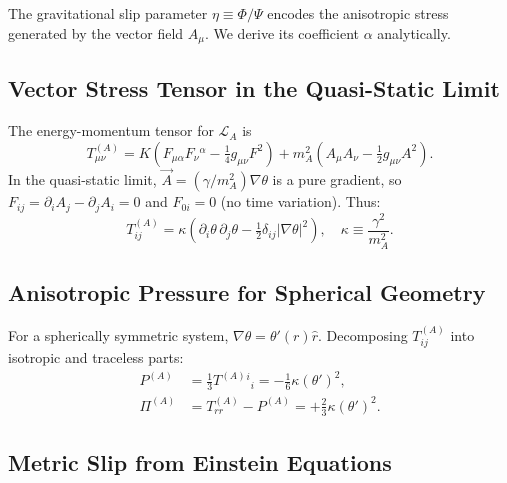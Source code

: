 \documentclass[aps,prd,twocolumn,showpacs,superscriptaddress]{revtex4-2}
\newcommand{\Lbar}{\mathcal{L}}
\begin{document}
The gravitational slip parameter $\eta \equiv \Phi/\Psi$ encodes the
anisotropic stress generated by the vector field $A_\mu$.
We derive its coefficient $\alpha$ analytically.

\subsection{Vector Stress Tensor in the Quasi-Static Limit}

The energy-momentum tensor for $\Lbar_A$ is
\begin{equation}
  T^{(A)}_{\mu\nu} = K\!\left(F_{\mu\alpha}F_\nu{}^\alpha
    - \tfrac{1}{4}g_{\mu\nu}F^2\right)
    + m_A^2\!\left(A_\mu A_\nu - \tfrac{1}{2}g_{\mu\nu}A^2\right).
\end{equation}
In the quasi-static limit, $\vec{A} = (\gamma/m_A^2)\nabla\theta$ is
a pure gradient, so $F_{ij} = \partial_i A_j - \partial_j A_i = 0$
and $F_{0i} = 0$ (no time variation). Thus:
\begin{equation}
  T^{(A)}_{ij} = \kappa\!\left(
    \partial_i\theta\,\partial_j\theta
    - \tfrac{1}{2}\delta_{ij}|\nabla\theta|^2
  \right),
  \quad \kappa \equiv \frac{\gamma^2}{m_A^2}.
  \label{eq:TAij}
\end{equation}

\subsection{Anisotropic Pressure for Spherical Geometry}

For a spherically symmetric system, $\nabla\theta = \theta'(r)\hat r$.
Decomposing $T^{(A)}_{ij}$ into isotropic and traceless parts:
\begin{align}
  P^{(A)} &= \tfrac{1}{3}T^{(A)}{}^i{}_i = -\tfrac{1}{6}\kappa(\theta')^2, \\
  \Pi^{(A)} &= T^{(A)}_{rr} - P^{(A)}
             = +\tfrac{2}{3}\kappa(\theta')^2.
  \label{eq:Pi}
\end{align}

\subsection{Metric Slip from Einstein Equations}
\end{document}
